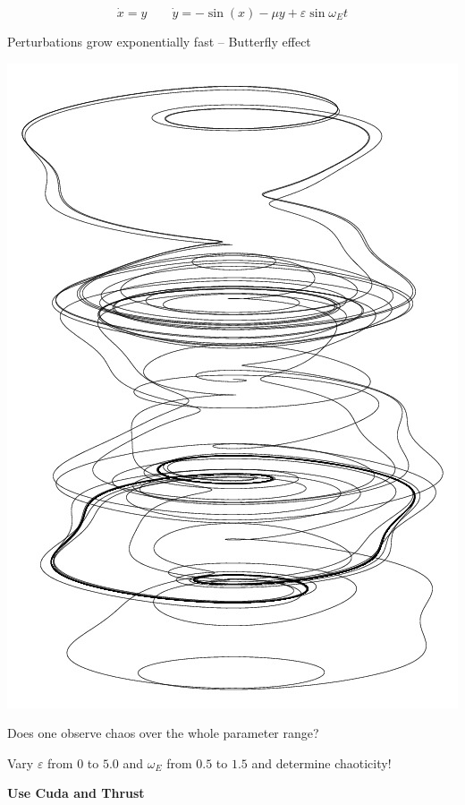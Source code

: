 \begin{frame}[fragile]
 

 $$
  \dot{x} = y \quad \quad \dot{y} = - \sin(x) - \mu y + \varepsilon \sin \omega_E t 
 $$

\vspace{2ex}
Perturbations grow exponentially fast -- Butterfly effect

\vspace{3ex}
\begin{minipage}{0.48\textwidth} \begin{center}
\centerline{\includegraphics[draft=false,angle=270,width=1.0\textwidth]{pendulum2.jpg}}
\end{center}\end{minipage}\begin{minipage}{0.48\textwidth}\begin{center}
Does one observe chaos over the whole parameter range?

\vspace{2ex}
Vary $\varepsilon$ from $0$ to $5.0$ and $\omega_E$ from $0.5$ to $1.5$ and determine chaoticity!
\end{center}\end{minipage}

\vspace{2ex}
\centerline{\bf Use Cuda and Thrust}

\end{frame}


